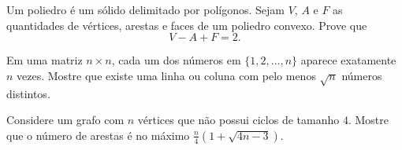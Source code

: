 \documentclass[10pt, a4paper]{article}
\begin{document}

	\begin{prob} %
		Um poliedro é um sólido delimitado por polígonos. Sejam $V$, $A$ e $F$ as quantidades de vértices, arestas e faces de um poliedro convexo. Prove que \[V - A + F = 2.\]
	\end{prob}

	
	\begin{prob}
		Em uma matriz $n \times n$, cada um dos números em $\{1, 2, \dots , n\}$ aparece exatamente $n$ vezes. Mostre que existe uma linha ou coluna com pelo menos $\sqrt{n}$ números distintos.
	\end{prob}
	


	\begin{prob} %
		Considere um grafo com $n$ vértices que não possui ciclos de tamanho $4$. Mostre que o número de arestas é no máximo $\frac{n}{4}(1 + \sqrt{4n - 3})$.
	\end{prob}


	

\end{document}
